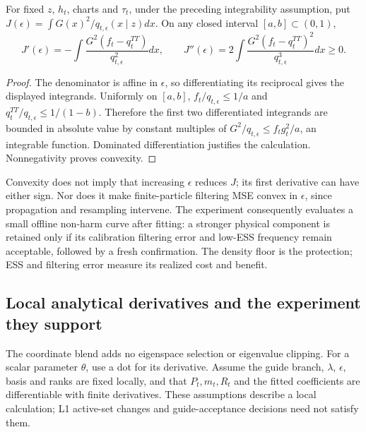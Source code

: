 \begin{proposition}
\label{prop:a11-epsilon}
For fixed $z$, $h_t$, charts and $\tau_t$, under the preceding integrability
assumption, put $J(\epsilon)=\int G(x)^2/q_{t,\epsilon}(x\mid z)dx$.
On any closed interval $[a,b]\subset(0,1)$,
\begin{equation}
 J'(\epsilon)=-\int\frac{G^2(f_t-q_t^{TT})}{q_{t,\epsilon}^2}dx,
 \qquad
 J''(\epsilon)=2\int\frac{G^2(f_t-q_t^{TT})^2}{q_{t,\epsilon}^3}dx
 \ge0.
 \label{eq:a11-epsilon}
\end{equation}
\end{proposition}
\begin{proof}
The denominator is affine in $\epsilon$, so differentiating its reciprocal
gives the displayed integrands. Uniformly on $[a,b]$,
$f_t/q_{t,\epsilon}\le1/a$ and
$q_t^{TT}/q_{t,\epsilon}\le1/(1-b)$. Therefore the first two differentiated
integrands are bounded in absolute value by constant multiples of
$G^2/q_{t,\epsilon}\le f_tg_t^2/a$, an integrable function.
Dominated differentiation justifies the calculation. Nonnegativity proves
convexity.
\end{proof}

Convexity does not imply that increasing $\epsilon$ reduces $J$; its first
derivative can have either sign. Nor does it make finite-particle filtering
MSE convex in $\epsilon$, since propagation and resampling intervene.
The experiment consequently evaluates a small offline non-harm curve after
fitting: a stronger physical component is retained only if its calibration
filtering error and low-ESS frequency remain acceptable, followed by a fresh
confirmation. The density floor is the protection; ESS and filtering error
measure its realized cost and benefit.

\subsection{Local analytical derivatives and the experiment they support}

The coordinate blend adds no eigenspace selection or eigenvalue clipping.
For a scalar parameter $\theta$, use a dot for its derivative. Assume the
guide branch, $\lambda$, $\epsilon$, basis and ranks are fixed locally,
and that $P_t,m_t,R_t$ and the fitted coefficients are differentiable with
finite derivatives. These assumptions describe a local calculation; L1
active-set changes and guide-acceptance decisions need not satisfy them.


